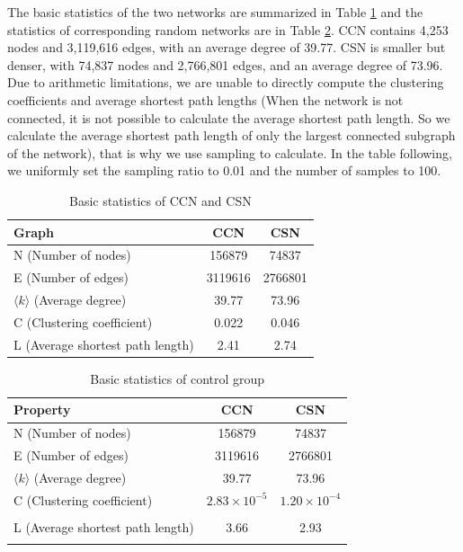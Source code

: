 \documentclass[11pt]{article}
\begin{document}
The basic statistics of the two networks are summarized in Table \ref{tab:network_stats} and the statistics of corresponding random networks are in Table \ref{tab:control_group_stats}. CCN contains 4,253 nodes and 3,119,616 edges, with an average degree of 39.77. CSN is smaller but denser, with 74,837 nodes and 2,766,801 edges, and an average degree of 73.96. Due to arithmetic limitations, we are unable to directly compute the clustering coefficients and average shortest path lengths (When the network is not connected, it is not possible to calculate the average shortest path length. So we calculate the average shortest path length of only the largest connected subgraph of the network), that is why we use sampling to calculate. In the table following, we uniformly set the sampling ratio to 0.01 and the number of samples to 100. 
\begin{table}[htbp]
    \centering
    \caption{Basic statistics of CCN and CSN}
    \label{tab:network_stats}
    \begin{tabular}{|p{6cm}|c|c|}
        \hline
        \toprule
        Graph & {CCN} & {CSN} \\
        \midrule
        N (Number of nodes) & 156879 & 74837 \\
        E (Number of edges) & 3119616 & 2766801 \\
        $\langle k \rangle$ (Average degree) & 39.77 & 73.96 \\
        C (Clustering coefficient) & 0.022 & 0.046 \\
        L (Average shortest path length) & 2.41 & 2.74 \\
        \bottomrule
    \end{tabular}
\end{table}

\begin{table}[htbp]
    \centering
    \caption{Basic statistics of control group}
    \label{tab:control_group_stats}
    \begin{tabular}{|p{6cm}|c|c|}
        \hline
        \toprule
        Property & {CCN} & {CSN} \\
        \midrule
        N (Number of nodes) & 156879 & 74837 \\
        E (Number of edges) & 3119616 & 2766801 \\
        $\langle k \rangle$ (Average degree) & 39.77 & 73.96 \\
        C (Clustering coefficient) & $2.83 \times 10^{-5}$ & $1.20 \times 10^{-4}$ \\\\
        L (Average shortest path length) & 3.66 & 2.93 \\\\
        \bottomrule
    \end{tabular}
\end{table}
\end{document}
